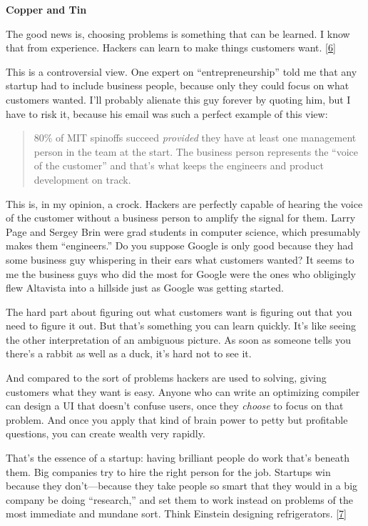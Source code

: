 \textbf{Copper and Tin}

The good news is, choosing problems is something that can be learned. I
know that from experience. Hackers can learn to make things customers
want. {[}\hyperref[f6n]{6}{]}

This is a controversial view. One expert on ``entrepreneurship'' told me
that any startup had to include business people, because only they could
focus on what customers wanted. I'll probably alienate this guy forever
by quoting him, but I have to risk it, because his email was such a
perfect example of this view:

\begin{quote}
80\% of MIT spinoffs succeed \emph{provided} they have at least one
management person in the team at the start. The business person
represents the ``voice of the customer'' and that's what keeps the
engineers and product development on track.
\end{quote}

This is, in my opinion, a crock. Hackers are perfectly capable of
hearing the voice of the customer without a business person to amplify
the signal for them. Larry Page and Sergey Brin were grad students in
computer science, which presumably makes them ``engineers.'' Do you
suppose Google is only good because they had some business guy
whispering in their ears what customers wanted? It seems to me the
business guys who did the most for Google were the ones who obligingly
flew Altavista into a hillside just as Google was getting started.

The hard part about figuring out what customers want is figuring out
that you need to figure it out. But that's something you can learn
quickly. It's like seeing the other interpretation of an ambiguous
picture. As soon as someone tells you there's a rabbit as well as a
duck, it's hard not to see it.

And compared to the sort of problems hackers are used to solving, giving
customers what they want is easy. Anyone who can write an optimizing
compiler can design a UI that doesn't confuse users, once they
\emph{choose} to focus on that problem. And once you apply that kind of
brain power to petty but profitable questions, you can create wealth
very rapidly.

That's the essence of a startup: having brilliant people do work that's
beneath them. Big companies try to hire the right person for the job.
Startups win because they don't---because they take people so smart that
they would in a big company be doing ``research,'' and set them to work
instead on problems of the most immediate and mundane sort. Think
Einstein designing refrigerators. {[}\hyperref[f7n]{7}{]}

